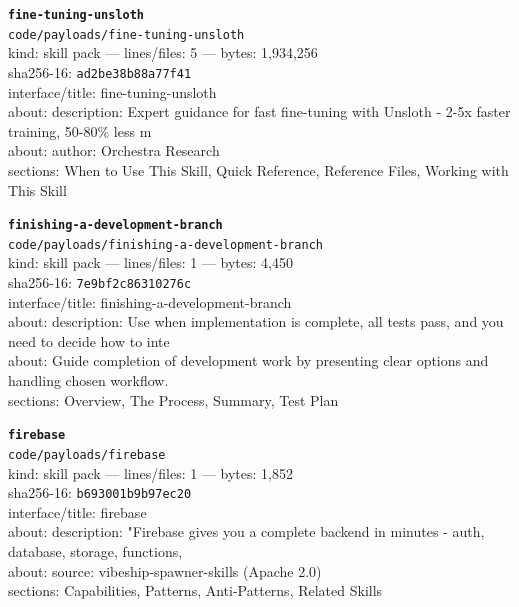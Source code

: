 \noindent\textbf{\texttt{fine-tuning-unsloth}}\\
\texttt{code/payloads/fine-tuning-unsloth}\\
kind: skill pack --- lines/files: 5 --- bytes: 1,934,256\\
sha256-16: \texttt{ad2be38b88a77f41}\\
interface/title: fine-tuning-unsloth\\
about: description: Expert guidance for fast fine-tuning with Unsloth - 2-5x faster training, 50-80\% less m\\
about: author: Orchestra Research\\
sections: When to Use This Skill, Quick Reference, Reference Files, Working with This Skill\\
\vspace*{6.0pt}
\newpage

\noindent\textbf{\texttt{finishing-a-development-branch}}\\
\texttt{code/payloads/finishing-a-development-branch}\\
kind: skill pack --- lines/files: 1 --- bytes: 4,450\\
sha256-16: \texttt{7e9bf2c86310276c}\\
interface/title: finishing-a-development-branch\\
about: description: Use when implementation is complete, all tests pass, and you need to decide how to inte\\
about: Guide completion of development work by presenting clear options and handling chosen workflow.\\
sections: Overview, The Process, Summary, Test Plan\\
\vspace*{6.0pt}

\noindent\textbf{\texttt{firebase}}\\
\texttt{code/payloads/firebase}\\
kind: skill pack --- lines/files: 1 --- bytes: 1,852\\
sha256-16: \texttt{b693001b9b97ec20}\\
interface/title: firebase\\
about: description: "Firebase gives you a complete backend in minutes - auth, database, storage, functions,\\
about: source: vibeship-spawner-skills (Apache 2.0)\\
sections: Capabilities, Patterns, Anti-Patterns, Related Skills\\
\vspace*{6.0pt}

